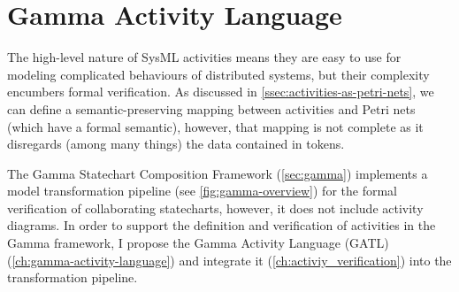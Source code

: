 \chapter{Gamma Activity Language}\label{ch:gamma-activity-language}

The high-level nature of SysML activities means they are easy to use for modeling complicated behaviours of distributed systems, but their complexity encumbers formal verification. As discussed in \autoref{ssec:activities-as-petri-nets}, we can define a semantic-preserving mapping between activities and Petri nets (which have a formal semantic), however, that mapping is not complete as it disregards (among many things) the data contained in tokens.

The Gamma Statechart Composition Framework (\autoref{sec:gamma}) implements a model transformation pipeline (see \autoref{fig:gamma-overview}) for the formal verification of collaborating statecharts, however, it does not include activity diagrams. In order to support the definition and verification of activities in the Gamma framework, I propose the Gamma Activity Language (GATL) (\autoref{ch:gamma-activity-language}) and integrate it (\autoref{ch:activiy_verification}) into the transformation pipeline.




